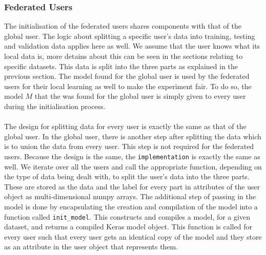 \documentclass[12pt]{article}
\begin{document}
\subsubsection{Federated Users}
The initialisation of the federated users shares components with that of the global user. The logic about splitting a specific user's data into training, testing and validation data applies here as well. We assume that the user knows what its local data is, more detains about this can be seen in the sections relating to specific datasets. This data is split into the three parts as explained in the previous section. The model found for the global user is used by the federated users for their local learning as well to make the experiment fair. To do so, the model $M$ that the was found for the global user is simply given to every user during the initialisation process.
\\\\
The design for splitting data for every user is exactly the same as that of the global user. In the global user, there is another step after splitting the data which is to union the data from every user. This step is not required for the federated users. Because the design is the same, the \texttt{implementation} is exactly the same as well. We iterate over all the users and call the appropriate function, depending on the type of data being dealt with, to split the user's data into the three parts. These are stored as the data and the label for every part in attributes of the user object as multi-dimensional numpy arrays. The additional step of passing in the model is done by encapsulating the creation and compilation of the model into a function called \texttt{init\_model}. This constructs and compiles a model, for a given dataset, and returns a compiled Keras model object. This function is called for every user such that every user gets an identical copy of the model and they store as an attribute in the user object that represents them. 
\end{document}
